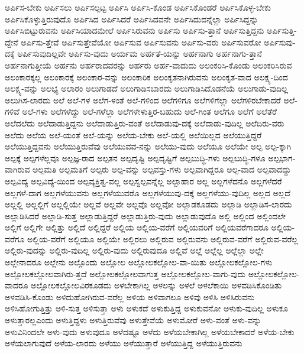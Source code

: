 {ಅರ್ಪಿಸ-ಬೇಕು
ಅರ್ಪಿಸಲು
ಅರ್ಪಿಸಲ್ಪಟ್ಟ
ಅರ್ಪಿಸಿ
ಅರ್ಪಿಸಿ-ಕೊಂಡ
ಅರ್ಪಿಸಿಕೊಂಡರೆ
ಅರ್ಪಿಸಿಕೊಳ್ಳ-ಬೇಕು
ಅರ್ಪಿಸಿಕೊಳ್ಳುತ್ತಿರುವುದೊ
ಅರ್ಪಿಸಿದ
ಅರ್ಪಿಸಿದರೆ
ಅರ್ಪಿಸಿದವನೇ
ಅರ್ಪಿಸಿದುದನ್ನೆಲ್ಲಾ
ಅರ್ಪಿಸಿದ್ದನ್ನು
ಅರ್ಪಿಸಿಬಿಟ್ಟುರುವನು
ಅರ್ಪಿಸಿಯಾದಮೇಲೆ
ಅರ್ಪಿಸಿರುವನು
ಅರ್ಪಿಸು
ಅರ್ಪಿಸು-ತ್ತಾನೆ
ಅರ್ಪಿಸುತ್ತಿದ್ದನು
ಅರ್ಪಿಸುತ್ತಿ-ದ್ದೇನೆ
ಅರ್ಪಿಸು-ತ್ತೇವೆ
ಅರ್ಪಿಸುತ್ತೇವೆಯೋ
ಅರ್ಪಿಸುವ
ಅರ್ಪಿಸುವನು
ಅರ್ಪಿಸು-ವರು
ಅರ್ಪಿಸುವರೋ
ಅರ್ಪಿಸುವು-ದಕ್ಕೆ
ಅರ್ಪಿಸುವುದಿಲ್ಲವೇ
ಅರ್ಪಿಸು-ವುದು
ಅರ್ಯಮ
ಅರ್ಹತೆ-ಯನ್ನು
ಅರ್ಹನಾಗು
ಅರ್ಹನಾಗು-ತ್ತಾನೆ
ಅರ್ಹನಾಗುತ್ತೀಯೆ
ಅರ್ಹನು
ಅರ್ಹರಾದವರನ್ನು
ಅರ್ಹರು
ಅರ್ಹ-ವಾದುದು
ಅಲಂಕರಿಸಿ-ಕೊಂಡು
ಅಲಂಕರಿಸಿರುವ
ಅಲಂಕಾರಕ್ಕಲ್ಲ
ಅಲಂಕಾರಕ್ಕೆ
ಅಲಂಕಾರ-ವನ್ನು
ಅಲಂಕಾರಿಕ
ಅಲಂಕೃತನಾಗಿರುವನು
ಅಲಂಕೃತ-ವಾದ
ಅಲಕ್ಷ್ಯ-ದಿಂದ
ಅಲಕ್ಷ್ಯ-ವನ್ನು
ಅಲಭ್ಯ
ಅಲಾರಂ
ಅಲುಗಾಡದೆ
ಅಲುಗಾಡಿಸಬಾರದು
ಅಲುಗಾಡಿಸಿದೊಡನೆಯೆ
ಅಲುಗಾಡು-ವುದಿಲ್ಲ
ಅಲುಗಿಸ-ಲಾರದು
ಅಲೆ
ಅಲೆ-ಗಳ
ಅಲೆಗ-ಳಂತೆ
ಅಲೆ-ಗಳಿಂದ
ಅಲೆಗಳಿಗೂ
ಅಲೆಗಳಿಗೆಲ್ಲಾ
ಅಲೆಗಳಿರಬೇಕಾದರೆ
ಅಲೆ-ಗಳಿವೆ
ಅಲೆ-ಗಳು
ಅಲೆಗಳೆದ್ದು
ಅಲೆ-ಗಳೆಲ್ಲಾ
ಅಲೆಗಳೇಳುತ್ತಿರ-ಬಹುದು
ಅಲೆ-ಗಿಂತ
ಅಲೆಗೂ
ಅಲೆಗೆ
ಅಲೆತೆರೆ
ಅಲೆದಲೆದು
ಅಲೆದಾಡುತ್ತಿದ್ದನು
ಅಲೆದಾಡುತ್ತಿರು-ವಂತೆ
ಅಲೆದಾಡುವು-ದಕ್ಕೆ
ಅಲೆದಾಡು-ವುದಿಲ್ಲ
ಅಲೆದಿರು-ವರು
ಅಲೆದು
ಅಲೆಯ
ಅಲೆ-ಯಂತೆ
ಅಲೆ-ಯನ್ನು
ಅಲೆಯ-ಬೇಕು
ಅಲೆ-ಯಲ್ಲಿ
ಅಲೆಯಿಲ್ಲದ
ಅಲೆಯುತ್ತಿದ್ದರೆ
ಅಲೆಯುತ್ತಿದ್ದವನು
ಅಲೆಯುತ್ತಿರುವೆವು
ಅಲೆಯುವವ-ನನ್ನು
ಅಲೆಯು-ವುದು
ಅಲೆಯೂ
ಅಲೆಯೇ
ಅಲ್ಪ
ಅಲ್ಪ-ಕ್ಕಾಗಿ
ಅಲ್ಪಕ್ಕೆ
ಅಲ್ಪಗಳೆಲ್ಲವೂ
ಅಲ್ಪಜ್ಞ-ರಾದ
ಅಲ್ಪತನ
ಅಲ್ಪದೃಷ್ಟಿ
ಅಲ್ಪದೃಷ್ಟಿಗೆ
ಅಲ್ಪಬುದ್ಧಿ-ಗಳು
ಅಲ್ಪಬುದ್ಧಿ-ಗಳೂ
ಅಲ್ಪಭಾಗ-ವಾಗಿರುವ
ಅಲ್ಪಮತಿ
ಅಲ್ಪಮತಿಗೆ
ಅಲ್ಪರು
ಅಲ್ಪ-ವನ್ನು
ಅಲ್ಪವಸ್ತು-ಗಳು
ಅಲ್ಪವಾಗಿದ್ದರೂ
ಅಲ್ಪ-ವಾದ
ಅಲ್ಪವಾದದ್ದು
ಅಲ್ಪವಿದ್ಯ
ಅಲ್ಪವಿದ್ಯೆ-ಯಿಂದ
ಅಲ್ಪವ್ಯಕ್ತಿತ್ವ-ವಲ್ಲ
ಅಲ್ಪಸ್ವಲ್ಪವನ್ನೆಲ್ಲ
ಅಲ್ಪಾಹಾರ
ಅಲ್ಲ
ಅಲ್ಲಗಳೆದನೊ
ಅಲ್ಲಗಳೆದರೆ
ಅಲ್ಲಗಳೆ-ದಾಗ
ಅಲ್ಲಗಳೆಯುವನು
ಅಲ್ಲಗಳೆಯುವರೊ
ಅಲ್ಲಗಳೆಯುವು-ದಕ್ಕೆ
ಅಲ್ಲಗಳೆಯು-ವುದಿಲ್ಲ
ಅಲ್ಲದ
ಅಲ್ಲದೆ
ಅಲ್ಲಲ್ಲಿ
ಅಲ್ಲಲ್ಲಿಗೆ
ಅಲ್ಲಲ್ಲಿಯೇ
ಅಲ್ಲವೆ
ಅಲ್ಲವೇ
ಅಲ್ಲವೊ
ಅಲ್ಲವೋ
ಅಲ್ಲಾಡಕೂಡದು
ಅಲ್ಲಾಡಿ
ಅಲ್ಲಾಡಿಸ-ಲಾರದು
ಅಲ್ಲಾಡಿಸಿದರೆ
ಅಲ್ಲಾಡಿ-ಸುತ್ತ
ಅಲ್ಲಾಡುತ್ತಿದ್ದರೆ
ಅಲ್ಲಾಡುತ್ತಿರು-ವುದು
ಅಲ್ಲಾಡುವುದೊ
ಅಲ್ಲಿ
ಅಲ್ಲಿಂದ
ಅಲ್ಲಿಂದಲೇ
ಅಲ್ಲಿಗೆ
ಅಲ್ಲಿಗೇ
ಅಲ್ಲಿತ್ತು
ಅಲ್ಲಿದೆ
ಅಲ್ಲಿದ್ದರೆ
ಅಲ್ಲಿಯ
ಅಲ್ಲಿಯ-ವರೆಗೆ
ಅಲ್ಲಿಯವರಿಗೆ
ಅಲ್ಲಿಯವರೆಗಾದರೂ
ಅಲ್ಲಿಯ-ವರೆಗೂ
ಅಲ್ಲಿಯ-ವರೆಗೆ
ಅಲ್ಲಿಯೂ
ಅಲ್ಲಿಯೇ
ಅಲ್ಲಿರಲು
ಅಲ್ಲಿರುವ
ಅಲ್ಲಿರುವನು
ಅಲ್ಲಿರುವ-ವರೆಗೆ
ಅಲ್ಲಿರುವ-ವರೆಲ್ಲ
ಅಲ್ಲಿರು-ವುದನ್ನು
ಅಲ್ಲಿರು-ವುದಿಲ್ಲ
ಅಲ್ಲಿರು-ವುದು
ಅಲ್ಲಿರುವುದೂ
ಅಲ್ಲಿವೆ
ಅಲ್ಲೆ
ಅಲ್ಲೆಲ್ಲ
ಅಲ್ಲೆಲ್ಲಾ
ಅಲ್ಲೇ
ಅಲ್ಲೇನಾದರೂ
ಅಲ್ಲೇನು
ಅಲ್ಲೊಂದು
ಅಲ್ಲೋಲ
ಅಲ್ಲೋಲಕಲ್ಲೋಲ-ವಾ-ಯಿತು
ಅಲ್ಲೋಲಕಲ್ಲೋಲ-ಗಳು
ಅಲ್ಲೋಲಕಲ್ಲೋಲವಾಗಿರು-ತ್ತದೆ
ಅಲ್ಲೋಲಕಲ್ಲೋಲವಾಗುತ್ತ
ಅಲ್ಲೋಲಕಲ್ಲೋಲ-ವಾಗು-ವುದು
ಅಲ್ಲೋಲಕಲ್ಲೋಲ-ವಾದರೂ
ಅಲ್ಲೋಲಕಲ್ಲೋಲವಿರಕೂಡದು
ಅಳಬೇಕಾಗಿಲ್ಲ
ಅಳಲನ್ನು
ಅಳಲೆ
ಅಳಲೆಕಾಯಿ
ಅಳವಡಿಸಿಕೊಂಡಿತು
ಅಳವಡಿಸಿ-ಕೊಂಡು
ಅಳಿದುಹೋಗಿರುವ-ವರೆಲ್ಲ
ಅಳಿಯ
ಅಳಿವಾಗಲೂ
ಅಳಿವು
ಅಳಿಸಿ
ಅಳಿಸಿರುವನು
ಅಳಿಸಿಹೋಗುತ್ತಿತ್ತು
ಅಳಿ-ಸುತ್ತ
ಅಳಿಸುತ್ತಾ
ಅಳು
ಅಳುಕದೆ
ಅಳುಕುತ್ತಿದ್ದ
ಅಳುಕುವನೋ
ಅಳುಕು-ವುದಿಲ್ಲ
ಅಳುಕೂ
ಅಳುತ್ತಾರಲ್ಲಎಂದು
ಅಳುತ್ತಿದ್ದಳು
ಅಳುತ್ತಿರುವೆವು
ಅಳುತ್ತೇವೆಯೆ
ಅಳುಮೋರೆ
ಅಳು-ವಂತೆ
ಅಳು-ವನ್ನು
ಅಳುವಿನಿಂದಲೇ
ಅಳು-ವುದು
ಅಳುವುದೂ
ಅಳೆದಷ್ಟೂ
ಅಳೆದು
ಅಳೆಯಬೇಕಾಗಿಲ್ಲ
ಅಳೆಯಬೇಕಾದರೆ
ಅಳೆಯ-ಬೇಕು
ಅಳೆಯಲಾಗುವುದೆ
ಅಳೆಯ-ಲಾರದು
ಅಳೆಯು
ಅಳೆಯುತ್ತಾರೆ
ಅಳೆಯುತ್ತಿದ್ದ
ಅಳೆಯುತ್ತಿರುವನು
}
